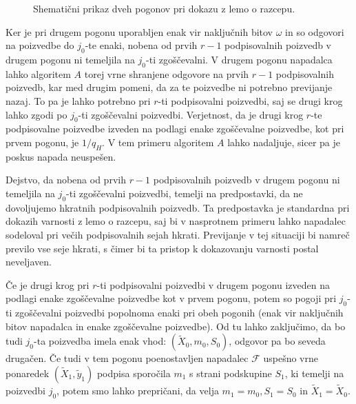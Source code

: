\begin{dokaz}
\begin{figure}[ht]
    \caption[Prikaz dveh pogonov.]{Shematični prikaz dveh pogonov pri dokazu z lemo o razcepu.}
    \label{fig:forking_lemma}
\end{figure}

Ker je pri drugem pogonu uporabljen enak vir naključnih bitov $\omega$ in so odgovori na poizvedbe do
$j_0$-te enaki, nobena od prvih $r - 1$ podpisovalnih poizvedb v drugem pogonu ni temeljila na $j_0$-ti
zgoščevalni. V drugem pogonu napadalca lahko algoritem $A$ torej vrne shranjene odgovore na prvih
$r - 1$ podpisovalnih poizvedb, kar med drugim pomeni, da za te poizvedbe ni potrebno previjanje
nazaj. To pa je lahko potrebno pri $r$-ti podpisovalni poizvedbi, saj se drugi krog lahko zgodi po
$j_0$-ti zgoščevalni poizvedbi. Verjetnost, da je drugi krog $r$-te podpisovalne poizvedbe izveden
na podlagi enake zgoščevalne poizvedbe, kot pri prvem pogonu, je $1/q_H$. V tem primeru algoritem $A$
lahko nadaljuje, sicer pa je poskus napada neuspešen.

\begin{opomba}
    Dejstvo, da nobena od prvih $r - 1$ podpisovalnih poizvedb v drugem pogonu ni temeljila na
    $j_0$-ti zgoščevalni poizvedbi, temelji na predpostavki, da ne dovoljujemo hkratnih podpisovalnih
    poizvedb. Ta predpostavka je standardna pri dokazih varnosti z lemo o razcepu, saj bi v nasprotnem
    primeru lahko napadalec sodeloval pri večih podpisovalnih sejah hkrati. Previjanje v tej situaciji
    bi namreč previlo vse seje hkrati, s čimer bi ta pristop k dokazovanju varnosti postal neveljaven.
\end{opomba}

Če je drugi krog pri $r$-ti podpisovalni poizvedbi v drugem pogonu izveden na podlagi enake zgoščevalne
poizvedbe kot v prvem pogonu, potem so pogoji pri $j_0$-ti zgoščevalni poizvedbi popolnoma enaki pri
obeh pogonih (enak vir naključnih bitov napadalca in enake zgoščevalne poizvedbe). Od tu lahko zaključimo,
da bo tudi $j_0$-ta poizvedba imela enak vhod: $(\tilde{X}_0, m_0, S_0)$, odgovor pa bo seveda drugačen.
Če tudi v tem pogonu poenostavljen napadalec $\mathcal{F}$ uspešno vrne ponaredek $(\tilde{X}_1,
\tilde{y}_1)$ podpisa sporočila $m_1$ s strani podskupine $S_1$, ki temelji na poizvedbi $j_0$, potem
smo lahko prepričani, da velja $m_1 = m_0, S_1 = S_0$ in $\tilde{X}_1 = \tilde{X}_0$.


\end{dokaz}
